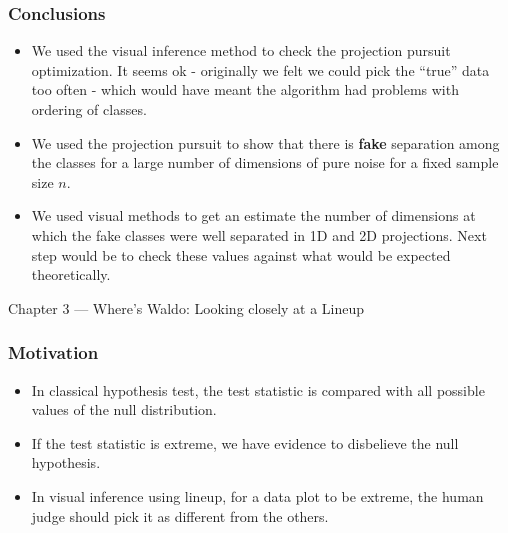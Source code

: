 \documentclass{beamer}
\begin{document}

\begin{frame}
\frametitle{Conclusions}
\begin{itemize}
\item We used the visual inference method to check the projection pursuit optimization. It seems ok - originally we felt we could pick the ``true'' data too often - which would have meant the algorithm had problems with ordering of classes.
\item We used the projection pursuit to show that there is {\bf fake} separation among the classes for a large number of dimensions of pure noise for a fixed sample size $n$.
\item We used visual methods to get an estimate the number of dimensions at which the fake classes were well separated in 1D and 2D projections. Next step would be to check these values against what would be expected theoretically.
\end{itemize}
\end{frame}

\begin{frame}
\begin{block}{}
\begin{center} \Large{Chapter 3 --- Where's Waldo: Looking closely at a Lineup} \end{center}
\end{block}
\end{frame}

\begin{frame}
\frametitle{Motivation}
\begin{itemize}
\item In classical hypothesis test, the test statistic is compared with all possible values of the null distribution.
\item If the test statistic is extreme, we have evidence to disbelieve the null hypothesis.
\item In visual inference using lineup, for a data plot to be extreme, the human judge should pick it as different from the others.
\end{itemize}
\end{frame}
\end{document}
